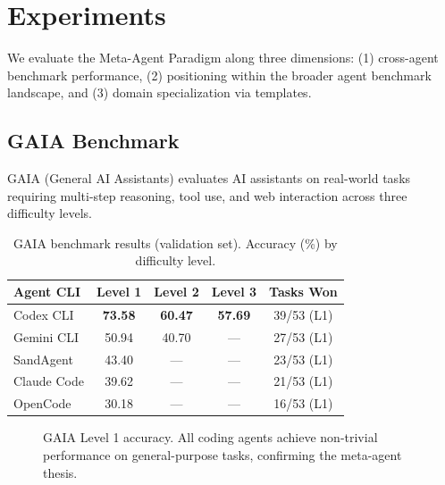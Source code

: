 \section{Experiments}

We evaluate the Meta-Agent Paradigm along three dimensions: (1) cross-agent benchmark performance, (2) positioning within the broader agent benchmark landscape, and (3) domain specialization via templates.

\subsection{GAIA Benchmark}

GAIA (General AI Assistants) \citep{mialon2023gaia} evaluates AI assistants on real-world tasks requiring multi-step reasoning, tool use, and web interaction across three difficulty levels.

\begin{table}[h]
\caption{GAIA benchmark results (validation set). Accuracy (\%) by difficulty level.}
\label{tab:gaia}
\centering
\small
\begin{tabular}{@{}lcccc@{}}
\toprule
\textbf{Agent CLI} & \textbf{Level 1} & \textbf{Level 2} & \textbf{Level 3} & \textbf{Tasks Won} \\
\midrule
Codex CLI      & \textbf{73.58} & \textbf{60.47} & \textbf{57.69} & 39/53 (L1) \\
Gemini CLI     & 50.94 & 40.70 & --- & 27/53 (L1) \\
SandAgent      & 43.40 & --- & --- & 23/53 (L1) \\
Claude Code    & 39.62 & --- & --- & 21/53 (L1) \\
OpenCode       & 30.18 & --- & --- & 16/53 (L1) \\
\bottomrule
\end{tabular}
\end{table}

\begin{figure}[ht]
\centering
{}
\caption{GAIA Level 1 accuracy. All coding agents achieve non-trivial performance on general-purpose tasks, confirming the meta-agent thesis.}
\label{fig:gaia-chart}
\end{figure}

